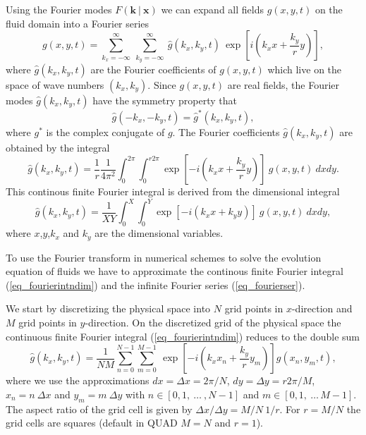Using the Fourier modes $F(\mathbf{k} \ | \ \mathbf{x})$ we can expand all 
fields $g(x,y,t)$ on the fluid domain into a Fourier series
\begin{equation} \label{eq_fourierser}
  g(x,y,t) 
   =  
  \sum_{k_{x} = -\infty}^{\infty} \ \sum_{k_{y} = -\infty}^{\infty} \ 
   \hat{g}(k_{x},k_{y},t) \ 
   \exp
   \left[ 
     i \left(k_{x} x + \frac{k_{y}}{r} y \right)
   \right],
\end{equation}
where $\hat{g}(k_{x},k_{y},t)$ are the Fourier coefficients of 
$g(x,y,t)$ which live on the space of wave numbers $(k_{x},k_{y})$.
Since $g(x,y,t)$ are real fields, the Fourier modes $\hat{g}(k_{x},k_{y},t)$
have the symmetry property that
\begin{equation}
  \hat{g}(-k_{x},-k_{y},t)  = \hat{g}^{\ast}(k_{x},k_{y},t),
\end{equation}
where $g^{\ast}$ is the complex conjugate of $g$. The Fourier
coefficients $\hat{g}(k_{x},k_{y},t)$ are obtained by the integral
\begin{equation} \label{eq_fourierintndim}
  \hat{g}(k_{x},k_{y},t)
   = 
  \frac{1}{r} \frac{1}{4 \pi^{2}} 
   \int_{0}^{2 \pi} \int_{0}^{r 2 \pi}
   \exp  
   \left[ 
    -i \left(k_{x} x + \frac{k_{y}}{r} y \right)
   \right] \
   g(x,y,t) \ 
dx dy.
\end{equation}
This continous finite Fourier integral is derived from the
dimensional integral 
\begin{equation} \label{eq_fourierint}
  \hat{g}(k_{x},k_{y},t)
   =
  \frac{1}{XY} \int_{0}^{X} \int_{0}^{Y}
   \exp
   \left[
    -i \left(k_{x} x + k_{y} y \right)
   \right] \
   g(x,y,t) \
dx dy,
\end{equation}
where $x$,$y$,$k_{x}$ and $k_{y}$ are the dimensional variables.

To use the Fourier transform in numerical schemes to solve the evolution
equation of fluids we have to approximate the continous finite Fourier integral
(\ref{eq_fourierintndim}) and the infinite Fourier series
(\ref{eq_fourierser}).

We start by discretizing the physical space into $N$ grid points in
$x$-direction and $M$ grid points in $y$-direction. On the discretized
grid of the physical space the continuous finite Fourier integral
(\ref{eq_fourierintndim}) reduces to the double sum
\begin{equation} \label{eq_fourierintprox}
   \hat{g}(k_{x},k_{y},t)
    = 
   \frac{1}{N M} 
   \sum_{n = 0}^{N-1} \sum_{m=0}^{M-1} \
    \exp 
     \left[-i    
      \left(
       k_{x} x_{n} + \frac{k_{y}}{r} y_{m}
      \right)
     \right]
     g(x_{n},y_{m},t),
\end{equation}
where we use the approximations $dx = \Delta x =2\pi/N$, 
$dy = \Delta y = r 2\pi/M $, $x_{n} = n \ \Delta x$ 
and $y_{m} = m \ \Delta y$ with $n \in [0,1,\ \dots \ ,N-1]$ and
$m \in [0,1,\ \dots \,M-1]$. The aspect ratio of the grid cell 
is given by $\Delta x/\Delta y = M/N \ 1/r$. For $r = M/N$ 
the grid cells are squares (default in QUAD $M=N$ and $r=1$).
 
